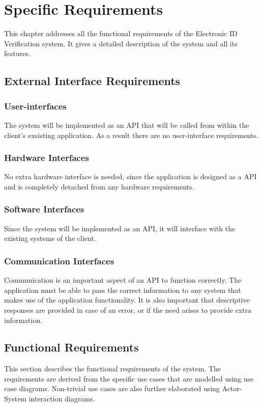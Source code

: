 \documentclass{article}
\def \project{Electronic ID Verification }
\begin{document}
	\cleardoublepage

	\section{Specific Requirements}\label{sec:specific-requirements}
		This chapter addresses all the functional requirements of the \project system. It gives a detailed description of the system and all its features.

		\subsection{External Interface Requirements}\label{subsec:specific-external}
		\subsubsection{User-interfaces}
		The system will be implemented as an API that will be called from within the client's exsisting application. As a result there are no user-interface requirements.
		\subsubsection{Hardware Interfaces}
		No extra hardware interface is needed, since the application is designed as a API and is completely detached from any hardware requirements.
		\subsubsection{Software Interfaces}
		Since the system will be implemented as an API, it will interface with the existing systems of the client.
		\subsubsection{Communication Interfaces}
		Communication is an important aspect of an API to function correctly. The application must be able to pass the correct information to any system that makes use of the application functionality. It is also important that descriptive responses are provided in case of an error, or if the need arises to provide extra information.\\
			

		\subsection{Functional Requirements}\label{subsec:specific-functional}
		This section describes the functional requirements of the system. The requirements are derived from the specific use cases that are modelled using use case diagrams. Non-trivial use cases are also further elaborated using Actor-System interaction diagrams.
		
\end{document}
